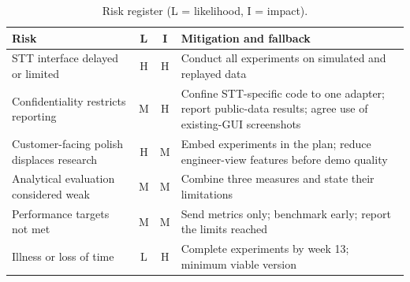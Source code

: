 \begin{table}[H]
    \centering\small
    \caption{Risk register (L = likelihood, I = impact).}
    \label{tab:risks}
    \begin{tabularx}{\columnwidth}{YccY}
        \toprule
        Risk                                      & L & I & Mitigation and fallback                                                                                     \\
        \midrule
        STT interface delayed or limited          & H & H & Conduct all experiments on simulated and replayed data                                                      \\
        Confidentiality restricts reporting       & M & H & Confine STT-specific code to one adapter; report public-data results; agree use of existing-GUI screenshots \\
        Customer-facing polish displaces research & H & M & Embed experiments in the plan; reduce engineer-view features before demo quality                            \\
        Analytical evaluation considered weak     & M & M & Combine three measures and state their limitations                                                          \\
        Performance targets not met               & M & M & Send metrics only; benchmark early; report the limits reached                                               \\
        Illness or loss of time                   & L & H & Complete experiments by week 13; minimum viable version                                                     \\
        \bottomrule
    \end{tabularx}
\end{table}

